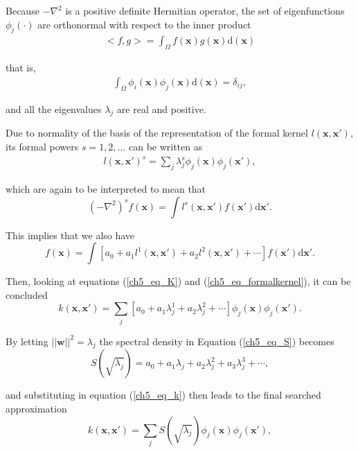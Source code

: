 \documentclass[onecolumn,a4paper,11pt]{article}
\begin{document}
\noindent Because $-\nabla^2$ is a positive definite Hermitian operator, the set of eigenfunctions $\phi_j(\cdot)$ are orthonormal with respect to the inner product
%
\begin{align*}
<f,g>=\int_\Omega f(\bm{x}) g(\bm{x}) \mathrm{d}(\bm{x})
\end{align*} 

\noindent that is,
%
\begin{align*}
\int_\Omega \phi_i(\bm{x}) \phi_j(\bm{x}) \mathrm{d}(\bm{x}) = \delta_{ij},
\end{align*} 

\noindent and all the eigenvalues $\lambda_j$ are real and positive. 

Due to normality of the basis of the representation of the formal kernel $l(\bm{x},\bm{x}')$, its formal powers $s=1,2,\dots$ can be written as
%
\begin{eqnarray}\label{ch5_eq_formalkernel}
l(\bm{x},\bm{x}')^s= \sum_j \lambda_j^s \phi_j(\bm{x}) \phi_j(\bm{x}'),
\end{eqnarray} 

\noindent which are again to be interpreted to mean that
%
\begin{equation*}
(-\nabla^2)^s f(\bm{x}) = \int l^s(\bm{x},\bm{x}') f(\bm{x}') \mathrm{d}\bm{x}'.
\end{equation*} 

\noindent This implies that we also have
%
\begin{equation*}
[a_0+a_1(-\nabla^2)+a_2(-\nabla^2)^2+\cdots] f(\bm{x}) = \int [a_0+a_1l^1(\bm{x},\bm{x}')+a_2l^2(\bm{x},\bm{x}')+\cdots] f(\bm{x}')  \mathrm{d}\bm{x}'.
\end{equation*} 


Then, looking at equations (\ref{ch5_eq_K}) and (\ref{ch5_eq_formalkernel}), it can be concluded 
%
\begin{equation}\label{ch5_eq_k}
k(\bm{x},\bm{x}')= \sum_j [a_0+a_1\lambda_j^1+a_2\lambda_j^2+\cdots] \phi_j(\bm{x}) \phi_j(\bm{x}').
\end{equation} 

\noindent By letting $||\bm{w}||^2=\lambda_j$ the spectral density in Equation (\ref{ch5_eq_S}) becomes
%
\begin{equation*}
S(\sqrt{\lambda_j})=a_0+a_1\lambda_j+a_2\lambda_j^2+a_3\lambda_j^3+\cdots,
\end{equation*}

\noindent and substituting in equation (\ref{ch5_eq_k}) then leads to the final searched approximation
%
\begin{equation}\label{ch5_eq_k_2}
k(\bm{x},\bm{x}')= \sum_j S(\sqrt{\lambda_j}) \phi_j(\bm{x}) \phi_j(\bm{x}'),
\end{equation} 
\end{document}

